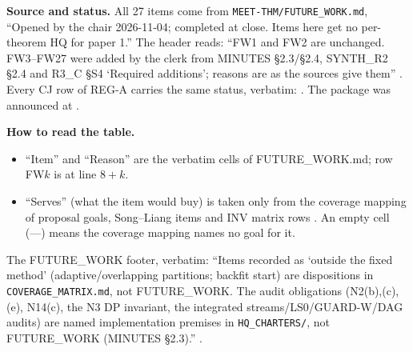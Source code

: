 \textbf{Source and status.} All 27 items come from \texttt{MEET-THM/FUTURE\_WORK.md}, ``Opened by the chair 2026-11-04; completed at close. Items here get no per-theorem HQ for paper 1.'' The header reads: ``FW1 and FW2 are unchanged. FW3–FW27 were added by the clerk from MINUTES §2.3/§2.4, SYNTH\_R2 §2.4 and R3\_C §S4 `Required additions'; reasons are as the sources give them'' . Every CJ row of REG-A carries the same status, verbatim:  . The package was announced at .

\textbf{How to read the table.}
\begin{itemize}
\item ``Item'' and ``Reason'' are the verbatim cells of FUTURE\_WORK.md; row FW$k$ is at line $8+k$.
\item ``Serves'' (what the item would buy) is taken only from the coverage mapping of proposal goals, Song--Liang items and INV matrix rows . An empty cell (---) means the coverage mapping names no goal for it.
\end{itemize}
The FUTURE\_WORK footer, verbatim: ``Items recorded as `outside the fixed method' (adaptive/overlapping partitions; backfit start) are dispositions in \texttt{COVERAGE\_MATRIX.md}, not FUTURE\_WORK. The audit obligations (N2(b),(c),(e), N14(c), the N3 DP invariant, the integrated streams/LS0/GUARD-W/DAG audits) are named implementation premises in \texttt{HQ\_CHARTERS/}, not FUTURE\_WORK (MINUTES §2.3).'' .

